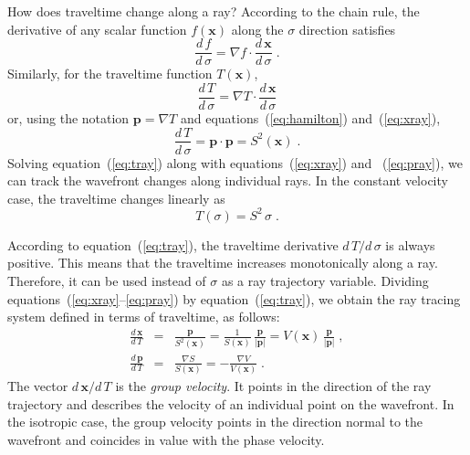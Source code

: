 
How does traveltime change along a ray? According to the chain rule,
the derivative of any scalar function $f(\mathbf{x})$ along the
$\sigma$ direction satisfies
\[
\frac{d\,f}{d\,\sigma} = \nabla f \cdot
\frac{d\,\mathbf{x}}{d\,\sigma}\;.
\]
Similarly, for the traveltime function $T(\mathbf{x})$,
\begin{equation}
  \label{eq:tray0}
  \frac{d\,T}{d\,\sigma} = \nabla T \cdot
  \frac{d\,\mathbf{x}}{d\,\sigma}
\end{equation}
or, using the notation $\mathbf{p} = \nabla T$ and
equations~(\ref{eq:hamilton}) and~(\ref{eq:xray}),
\begin{equation}
  \label{eq:tray}
  \frac{d\,T}{d\,\sigma}
  = \mathbf{p} \cdot \mathbf{p} =
  S^2(\mathbf{x})\;.
\end{equation}
Solving equation~(\ref{eq:tray}) along with equations~(\ref{eq:xray})
and ~(\ref{eq:pray}), we can track the wavefront changes along
individual rays. In the constant velocity case, the traveltime changes
linearly as
\begin{equation}
  \label{eq:tconst}
  T(\sigma) = S^2\,\sigma\;.
\end{equation}

According to equation~(\ref{eq:tray}), the traveltime derivative
$d\,T/d\,\sigma$ is always positive. This means that the traveltime
increases monotonically along a ray. Therefore, it can be used instead
of $\sigma$ as a ray trajectory variable. Dividing
equations~(\ref{eq:xray}--\ref{eq:pray}) by equation~(\ref{eq:tray}),
we obtain the ray tracing system defined in terms of traveltime, as
follows:
\begin{eqnarray}
  \label{eq:xrayt}
  \frac{d\,\mathbf{x}}{d\,T} & = & 
  \frac{\mathbf{p}}{S^2(\mathbf{x})} = 
  \frac{1}{S(\mathbf{x})}\,\frac{\mathbf{p}}{|\mathbf{p}|} =
  V(\mathbf{x})\,\frac{\mathbf{p}}{|\mathbf{p}|}\;, \\
  \label{eq:prayt}
  \frac{d\,\mathbf{p}}{d\,T} & = & \frac{\nabla S}{
    S(\mathbf{x})} = - \frac{\nabla V}{V(\mathbf{x})}\;.
\end{eqnarray}
The vector $d\,\mathbf{x}/d\,T$ is the \emph{group velocity}. It points
  in the direction of the ray trajectory and describes the velocity of
  an individual point on the wavefront. In the isotropic case, the
  group velocity points in the direction normal to the wavefront and
  coincides in value with the phase velocity.


